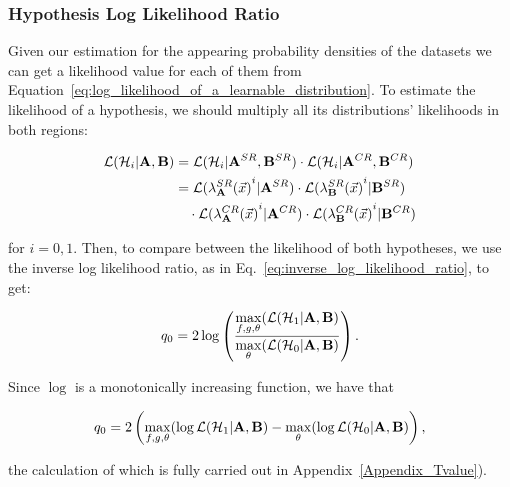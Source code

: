 \documentclass[../../ddppaper2.tex]{subfiles}
\begin{document}
\subsubsection{Hypothesis Log Likelihood Ratio}

Given our estimation for the appearing probability densities of the datasets we can get a likelihood value for each of them from Equation~\ref{eq:log_likelihood_of_a_learnable_distribution}. To estimate the likelihood of a hypothesis, we should multiply all its distributions' likelihoods in both regions:

\begin{equation}
\begin{aligned}
\mathcal{L}({\mathcal{H}_{i}} | {\mathbf{A}}, {\mathbf{B}})
    &= \mathcal{L}({\mathcal{H}_{i}}|{{\mathbf{A}}^{SR}}, {{\mathbf{B}}^{SR}})
       \cdot \mathcal{L}({\mathcal{H}_{i}}|{{\mathbf{A}}^{CR}}, {{\mathbf{B}}^{CR}}) \\
    &= \mathcal{L}({{\lambda}_{{\mathbf{A}}}^{SR}(\vec{{x}})}^i|{{\mathbf{A}}^{SR}})
       \cdot \mathcal{L}({{\lambda}_{{\mathbf{B}}}^{SR}(\vec{{x}})}^i|{{\mathbf{B}}^{SR}}) \\
    &\quad \cdot \mathcal{L}({{\lambda}_{{\mathbf{A}}}^{CR}(\vec{{x}})}^i|{{\mathbf{A}}^{CR}})
       \cdot \mathcal{L}({{\lambda}_{{\mathbf{B}}}^{CR}(\vec{{x}})}^i|{{\mathbf{B}}^{CR}})
\end{aligned}
\end{equation}

\noindent for $i=0,1$. Then, to compare between the likelihood of both hypotheses, we use the inverse log likelihood ratio, as in Eq.~\ref{eq:inverse_log_likelihood_ratio}, to get:

\begin{equation*}
{q_{0}} = 2 \log \left(
    \frac{
        \max\limits_{f, g, {\theta}} (\mathcal{L}({\mathcal{H}_{1}}|{\mathbf{A}}, {\mathbf{B}})
    }{
        \max\limits_{{\theta}} (\mathcal{L}({{\mathcal{H}_{0}}}|{\mathbf{A}}, {\mathbf{B}})
}\right).
\end{equation*}

\noindent Since $\log$ is a monotonically increasing function, we have that

\begin{equation}
\label{eq:high_level_overall_test_statistic}
    \invllratio = 2 \left( {\max\limits_{f, g, \nparam}(\log \likelihood(\hypothesis{1}|\dataset{A}, \dataset{B})} - {\max\limits_{\nparam}(\log \likelihood(\nullhypothesis|\dataset{A}, \dataset{B})} \right),
\end{equation}

\noindent the calculation of which is fully carried out in Appendix~\ref{Appendix_Tvalue}).
\end{document}
